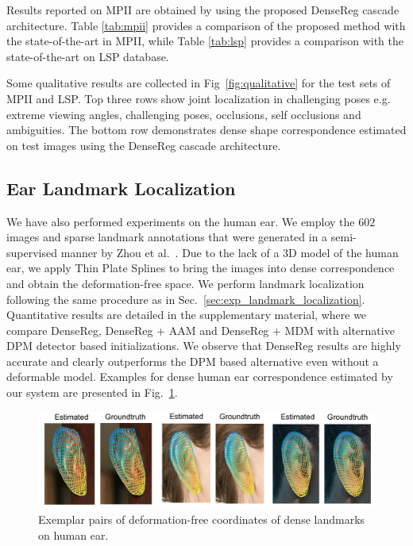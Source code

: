 Results reported on MPII are obtained by using the proposed DenseReg cascade architecture. Table \ref{tab:mpii} provides a comparison of the proposed method with the state-of-the-art in MPII, while Table \ref{tab:lsp} provides a comparison with the state-of-the-art on LSP database.

Some qualitative results are collected in Fig~\ref{fig:qualitative} for the test sets of MPII and LSP. Top three rows show joint localization in challenging poses e.g. extreme viewing angles, challenging poses, occlusions, self occlusions and ambiguities. The bottom row demonstrates dense shape correspondence estimated on test images using the DenseReg cascade architecture.

 
\subsection{Ear Landmark Localization}
\label{sec:exp_ear}

We have also performed experiments on the human ear. We employ the $602$ images and sparse landmark annotations that were generated in a semi-supervised manner by Zhou et al.~\cite{Zhou_2016_CVPR}. Due to the lack of a 3D model of the human ear, we apply Thin Plate Splines to bring the images into dense correspondence and obtain the deformation-free space. We perform landmark localization following the same procedure as in Sec.~\ref{sec:exp_landmark_localization}.
Quantitative results are detailed in the supplementary material, where we compare DenseReg, DenseReg + AAM and DenseReg + MDM with alternative DPM detector based initializations.  We observe that DenseReg results are highly accurate and clearly outperforms the DPM based alternative even without a deformable model. Examples for dense human ear correspondence estimated by our system  are presented in Fig.~\ref{fig:ears_examples}.


\begin{figure}[h]
\centering
\includegraphics[width=\linewidth]{resources/Human_Poses/ears3}
\caption{Exemplar pairs of deformation-free coordinates of dense landmarks on human ear.}
\label{fig:ears_examples}
\end{figure}

